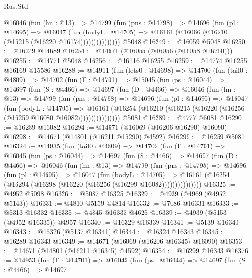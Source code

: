 \begin{lexlean}{RustStd}
\begin{coremodule}
                @16046
                  (fun (hn : @13) =>
                  @14799
                    (fun (pns : @14798) =>
                    @14696
                      (fun (pl : @14695) =>
                      @16047
                        (fun (bodyL : @14705) =>
                        @16161 (@16066 (@16210 (@16215 (@16220 @16174)))))))))))))))
    @5048
@16249 := @16059 @5048
@16250 := @16249 @14689
@16254 := @14671 (@16055 (@16056 (@16058 @16250)))
@16255 := @14771 @5048
@16256 := @16116 @16255
@16259 := @14774 @16255 @16169 @15586
@16288 := @14911
    (fun (lets0 : @14698) =>
    @14700
      (fun (tail0 : @4809) =>
      @14702
        (fun (Γ : @14701) =>
        @16045
          (fun (ps : @16044) =>
          @14697
            (fun (S : @4466) =>
            @14697
              (fun (D : @4466) =>
              @16046
                (fun (hn : @13) =>
                @14799
                  (fun (pns : @14798) =>
                  @14696
                    (fun (pl : @14695) =>
                    @16047
                      (fun (bodyL : @14705) =>
                      @16161
                        (@16254
                          (@16210 (@16215 (@16220 (@16256 (@16259 @16080 @16082))))))))))))))))
    @5081
@16289 := @4777 @5081
@16290 := @16289 @16082
@16294 := @14671 (@16069 (@16206 @16290) @16090)
@16298 := @14671 (@14801 (@16211 @16290) @4592)
@16299 := @16259 @5081
@16324 := @14935
    (fun (tail0 : @4809) =>
    @14702
      (fun (Γ : @14701) =>
      @16045
        (fun (ps : @16044) =>
        @14697
          (fun (S : @4466) =>
          @14697
            (fun (D : @4466) =>
            @16046
              (fun (hn : @13) =>
              @14799
                (fun (pns : @14798) =>
                @14696
                  (fun (pl : @14695) =>
                  @16047
                    (fun (bodyL : @14705) =>
                    @16161 (@16254 (@16294 (@16298 (@16220 (@16256 (@16299 @16082)))))))))))))))
@16325 := @4952 @5098
@16326 := @5087 @16325
@16329 := @4939 (@4969 (@4952 @5143))
@16331 := @4810 @5159 @4814
@16332 := @7086 @16331
@16333 := @5313 @16332
@16335 := @4845 @16333 @4625
@16339 := @4939 (@5153 (@4952 @16335)) @4957
@16340 := @16329 @16339
@16341 := @5139 @16340
@16343 := @16326 (@5137 @16341)
@16344 := @16324 @16343
@16345 := @16289 @16343
@16349 := @14671 (@16069 (@16206 @16345) @16090)
@16353 := @14671 (@14801 (@16211 @16345) @4592)
@16354 := @16299 @16343
@16376 := @14953
    (fun (Γ : @14701) =>
    @16045
      (fun (ps : @16044) =>
      @14697
        (fun (S : @4466) =>
        @14697

\end{coremodule}
\end{lexlean}
